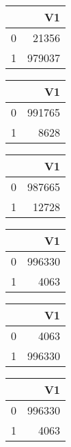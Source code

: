 \bigskip\bigskip
\centering
\begin{tabular}{rr}
  \hline
 & V1 \\ 
  \hline
0 & 21356 \\ 
  1 & 979037 \\ 
   \hline
\end{tabular}

\bigskip\bigskip
\centering
\begin{tabular}{rr}
  \hline
 & V1 \\ 
  \hline
0 & 991765 \\ 
  1 & 8628 \\ 
   \hline
\end{tabular}

\bigskip\bigskip
\centering
\begin{tabular}{rr}
  \hline
 & V1 \\ 
  \hline
0 & 987665 \\ 
  1 & 12728 \\ 
   \hline
\end{tabular}

\bigskip\bigskip
\centering
\begin{tabular}{rr}
  \hline
 & V1 \\ 
  \hline
0 & 996330 \\ 
  1 & 4063 \\ 
   \hline
\end{tabular}

\bigskip\bigskip
\centering
\begin{tabular}{rr}
  \hline
 & V1 \\ 
  \hline
0 & 4063 \\ 
  1 & 996330 \\ 
   \hline
\end{tabular}

\bigskip\bigskip
\centering
\begin{tabular}{rr}
  \hline
 & V1 \\ 
  \hline
0 & 996330 \\ 
  1 & 4063 \\ 
   \hline
\end{tabular}

